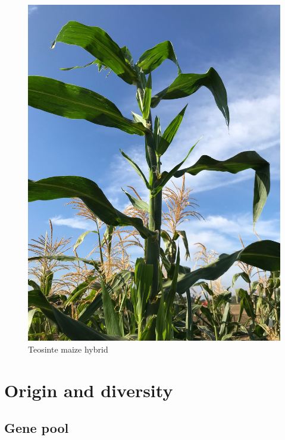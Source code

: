 \documentclass[
  ignorenonframetext,
  aspectratio=169]{beamer}
\begin{document}
\begin{frame}{}
\protect\hypertarget{section-9}{}
\begin{figure}

{\centering \includegraphics[width=0.4\linewidth]{./../images/Teosinte_maize_hybrid_cross} 

}

\caption{Teosinte maize hybrid}\label{fig:unnamed-chunk-1}
\end{figure}
\end{frame}

\hypertarget{origin-and-diversity}{%
\section{Origin and diversity}\label{origin-and-diversity}}

\hypertarget{gene-pool}{%
\subsection{Gene pool}\label{gene-pool}}
\end{document}
